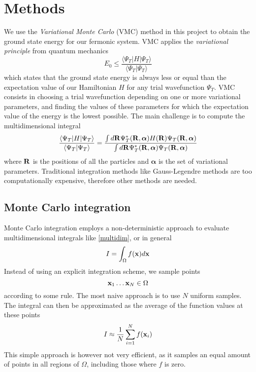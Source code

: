 \documentclass[english, a4paper]{article}
\begin{document}
\section{Methods}

We use the \textit{Variational Monte Carlo} (VMC) method in this project to obtain the ground state energy
for our fermonic system. VMC applies the \textit{variational principle} from quantum mechanics
\begin{equation}
 E_0 \leq \frac{\langle \Psi_T | H | \Psi_T \rangle}{\langle \Psi_T | \Psi_T \rangle}
\end{equation}
which states that the ground state energy is always less or equal than the expectation value of our Hamiltonian $H$
for any trial wavefunction $\Psi_T$. VMC consists in choosing a trial wavefunction depending on one or more
variational parameters, and finding the values of these parameters for which the expectation value of the 
energy is the lowest possible. The main challenge is to compute the multidimensional integral
\begin{equation}
 \frac{\langle \Psi_T | H | \Psi_T \rangle}{\langle \Psi_T | \Psi_T \rangle} = 
 \frac{\int d {\bf R} \Psi_T^*({\bf R}, \boldsymbol{\alpha}) H({\bf R}) \Psi_T({\bf R}, \boldsymbol{\alpha})}
       {\int d {\bf R} \Psi_T^*({\bf R}, \boldsymbol{\alpha}) \Psi_T({\bf R}, \boldsymbol{\alpha})}
 \label{multidim}
\end{equation}
where $\bf{R}$ is the positions of all the particles and $\boldsymbol{\alpha}$ is the set of variational parameters.
Traditional integration methods like Gauss-Legendre methods are too computationally expensive, therefore 
other methods are needed.

\subsection{Monte Carlo integration}

Monte Carlo integration employs a non-deterministic approach to evaluate multidimensional integrals like \eqref{multidim}, or
in general
\begin{equation}
 I = \int_\Omega f({\bf x}) d{\bf x}
\end{equation}
Instead of using an explicit integration scheme, we sample points
\begin{equation}
 {\bf x}_1 \dots {\bf x}_N \in \Omega
\end{equation}
according to some rule. The most naive approach is to use $N$ uniform samples. 
The integral can then be approximated as the average of the function values at these points
\begin{equation}
 I \approx \frac{1}{N} \sum_{i=1}^N f({\bf x}_i)
\end{equation}
This simple approach is however not very efficient, as it samples an equal amount of points in all regions of $\Omega$, 
including those where $f$ is zero. 
\end{document}
